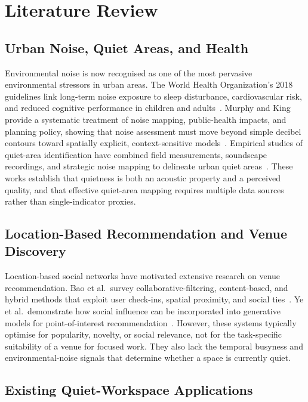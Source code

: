 \documentclass[conference]{IEEEtran}
\begin{document}
\section{Literature Review}
\label{sec:literature}

\subsection{Urban Noise, Quiet Areas, and Health}

Environmental noise is now recognised as one of the most pervasive environmental
stressors in urban areas. The World Health Organization's 2018 guidelines link long-term
noise exposure to sleep disturbance, cardiovascular risk, and reduced cognitive
performance in children and adults~\cite{who2018}. Murphy and King provide a systematic
treatment of noise mapping, public-health impacts, and planning policy, showing that
noise assessment must move beyond simple decibel contours toward spatially explicit,
context-sensitive models~\cite{murphy2014}. Empirical studies of quiet-area identification
have combined field measurements, soundscape recordings, and strategic noise mapping to
delineate urban quiet areas~\cite{matsinos2017,deMeulder2026}. These works establish that
quietness is both an acoustic property and a perceived quality, and that effective
quiet-area mapping requires multiple data sources rather than single-indicator proxies.

\subsection{Location-Based Recommendation and Venue Discovery}

Location-based social networks have motivated extensive research on venue
recommendation. Bao et al.\ survey collaborative-filtering, content-based, and hybrid
methods that exploit user check-ins, spatial proximity, and social ties~\cite{bao2015}.
Ye et al.\ demonstrate how social influence can be incorporated into generative models
for point-of-interest recommendation~\cite{ye2012}. However, these systems typically
optimise for popularity, novelty, or social relevance, not for the task-specific
suitability of a venue for focused work. They also lack the temporal busyness and
environmental-noise signals that determine whether a space is currently quiet.

\subsection{Existing Quiet-Workspace Applications}
\end{document}
